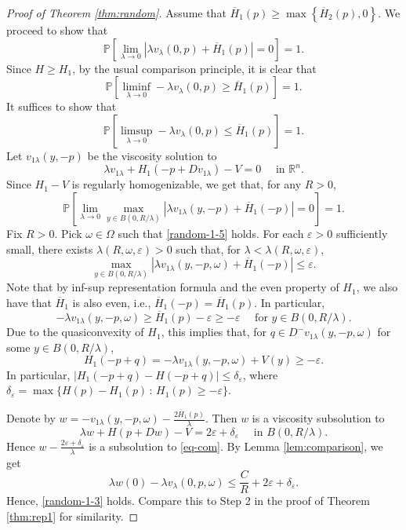 \documentclass[12pt,reqno]{amsart}
\theoremstyle{plain}
\theoremstyle{remark}
\numberwithin{equation}{section}
\newcommand{\bP}{\mathbb{P}}
\newcommand{\R}{\mathbb{R}}
\newcommand{\del}{\delta}
\newcommand{\ep}{\varepsilon}
\newcommand{\lam}{\lambda}
\newcommand{\om}{\omega}
\newcommand{\Om}{\Omega}
\newcommand{\ol}{\overline}
\begin{document}
\begin{proof}[Proof of Theorem \ref{thm:random}]
 Assume that $\ol{H}_1(p) \geq \max\left\{\ol{H}_2(p),0\right\}$. 
We proceed to show that
\begin{equation}\label{random-1-1}
\bP \left[ \lim_{\lam\to 0} \left|\lam v_\lam(0,p) + \ol{H}_1(p)\right|=0\right]=1.
\end{equation}
Since $H \geq H_1$, by the usual comparison principle, it is clear that
\begin{equation}\label{random-1-2}
\bP \left[ \liminf_{\lam\to 0} -\lam v_\lam(0,p) \geq \ol{H}_1(p)\right]=1.
\end{equation}
It suffices to show that
\begin{equation}\label{random-1-3}
\bP \left[ \limsup_{\lam\to 0} -\lam v_\lam(0,p) \leq \ol{H}_1(p)\right]=1.
\end{equation}
Let $v_{1\lam}(y,-p)$ be the viscosity solution to
\begin{equation}\label{random-1-4}
\lam v_{1\lam} + H_1(-p+Dv_{1\lam}) - V =0 \quad \text{ in } \R^n.
\end{equation}
Since $H_1-V$ is regularly homogenizable, we get that, for any $R>0$,
\begin{equation}\label{random-1-5}
\bP \left[ \lim_{\lam\to 0} \max_{y \in B(0,R/\lam)} \left|\lam v_{1\lam}(y,-p) + \ol{H}_1(-p)\right|=0\right]=1.
\end{equation}
Fix $R>0$. Pick $\om \in \Om$ such that \eqref{random-1-5} holds.
For each $\ep>0$ sufficiently small, there exists $\lam(R,\om,\ep)>0$ such that, for $\lam <\lam(R,\om,\ep)$,
\[
 \max_{y \in B(0,R/\lam)} \left|\lam v_{1\lam}(y,-p,\om) + \ol{H}_1(-p)\right| \leq \ep.
\]
Note that by inf-sup representation formula and the even property of $H_1$, we also have that $\ol{H}_1$ is also even, i.e., $\ol{H}_1(-p) = \ol{H}_1(p)$.
In particular,
\[
-\lam v_{1\lam}(y,-p,\om) \geq \ol{H}_1(p) - \ep \geq -\ep \quad \text{ for } y \in B(0,R/\lam).
\]
Due to the quasiconvexity of $H_1$,  this implies that, for $q \in D^- v_{1\lam}(y,-p,\om)$ for some $y \in B(0,R/\lam)$, 
\begin{equation}\label{random-1-6}
H_1(-p+q) = -\lam v_{1\lam}(y,-p,\om) +V(y) \geq -\ep.
\end{equation}
In particular, $|H_1(-p+q)-H(-p+q)|\leq \del_\ep$, where $\del_\ep = \max\{H(p)- H_1(p)\,:\, H_1(p) \geq -\ep\}$.

Denote by $w=-v_{1\lam}(y,-p,\om)  - \frac{2 \ol{H}_1(p)}{\lam}$. Then $w$ is a viscosity subsolution to
\[
\lam w + H(p+Dw) - V = 2\ep + \del_\ep \quad \text{ in } B(0,R/\lam).
\]
Hence $w - \frac{2\ep+\del_\ep}{\lam}$ is a subsolution to \eqref{eq-com}.
By Lemma \ref{lem:comparison}, we get
\[
\lam w(0) - \lam v_\lam(0,p,\om) \leq \frac{C}{R} +2 \ep + \del_\ep.
\]
Hence, \eqref{random-1-3} holds.
Compare this to Step 2 in the proof of Theorem \ref{thm:rep1} for similarity.
\smallskip


\end{proof}
\end{document}
